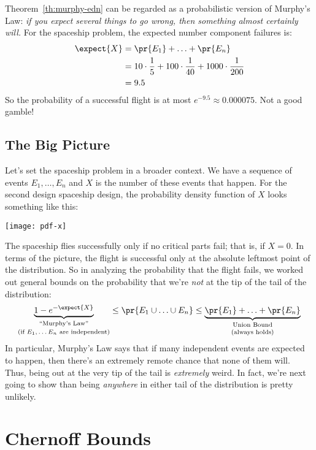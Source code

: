 \begin{editingnotes}
Theorem~\ref{th:murphy-edn} can be regarded as a probabilistic version
of Murphy's Law: \textit{if you expect several things to go wrong,
  then something almost certainly will.}  For the spaceship problem,
the expected number component failures is:
%
\begin{align*}
\expect{X}
    & = \pr{E_1} + \ldots + \pr{E_n} \\
    & = 10 \cdot \frac{1}{5} + 100 \cdot \frac{1}{40}
        + 1000 \cdot \frac{1}{200} \\
    & = 9.5
\end{align*}
%
So the probability of a successful flight is at most $e^{-9.5} \approx
0.000075$.  Not a good gamble!

\subsection{The Big Picture}

Let's set the spaceship problem in a broader context.  We have a
sequence of events $E_1, \ldots, E_n$ and $X$ is the number of these
events that happen.  For the second design spaceship design, the
probability density function of $X$ looks something like this:
%
\begin{center}
\texttt{[image: pdf-x]}
\end{center}
%
The spaceship flies successfully only if no critical parts fail; that
is, if $X = 0$.  In terms of the picture, the flight is successful
only at the absolute leftmost point of the distribution.  So in
analyzing the probability that the flight fails, we worked out general
bounds on the probability that we're \textit{not} at the tip of the
tail of the distribution:
%
\[
\underbrace{1 - e^{-\expect{X}}}_{
  \substack{\text{``Murphy's Law''} \\[0.5ex]
            \text{(if $E_1, \ldots E_n$ are independent)}}}
\leq \pr{E_1 \cup \ldots \cup E_n} \leq
\underbrace{\pr{E_1} + \ldots + \pr{E_n}}_{
  \substack{\text{Union Bound} \\[0.5ex]
            \text{(always holds)}}}
\]
%
In particular, Murphy's Law says that if many independent events are
expected to happen, then there's an extremely remote chance that none
of them will.  Thus, being out at the very tip of the tail is
\textit{extremely} weird.  In fact, we're next going to show than
being \textit{anywhere} in either tail of the distribution is pretty
unlikely.

\section{Chernoff Bounds}


\end{editingnotes}
